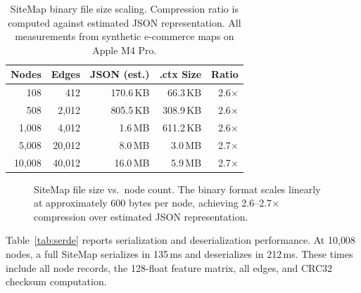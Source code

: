 \documentclass[10pt, twocolumn]{article}
\begin{document}
\begin{table}[t]
\caption{SiteMap binary file size scaling. Compression ratio is computed against estimated JSON representation. All measurements from synthetic e-commerce maps on Apple M4 Pro.}
\label{tab:filesize}
\centering
\small
\begin{tabular}{@{}rrrrr@{}}
\toprule
\textbf{Nodes} & \textbf{Edges} & \textbf{JSON (est.)} & \textbf{.ctx Size} & \textbf{Ratio} \\
\midrule
108 & 412 & 170.6\,KB & 66.3\,KB & 2.6$\times$ \\
508 & 2{,}012 & 805.5\,KB & 308.9\,KB & 2.6$\times$ \\
1{,}008 & 4{,}012 & 1.6\,MB & 611.2\,KB & 2.6$\times$ \\
5{,}008 & 20{,}012 & 8.0\,MB & 3.0\,MB & 2.7$\times$ \\
10{,}008 & 40{,}012 & 16.0\,MB & 5.9\,MB & 2.7$\times$ \\
\bottomrule
\end{tabular}
\end{table}

\begin{figure}[t]
\centering
{}
\caption{SiteMap file size vs.\ node count. The binary format scales linearly at approximately 600 bytes per node, achieving 2.6--2.7$\times$ compression over estimated JSON representation.}
\label{fig:filesize}
\end{figure}

Table~\ref{tab:serde} reports serialization and deserialization performance. At 10{,}008 nodes, a full SiteMap serializes in 135\,ms and deserializes in 212\,ms. These times include all node records, the 128-float feature matrix, all edges, and CRC32 checksum computation.
\end{document}
